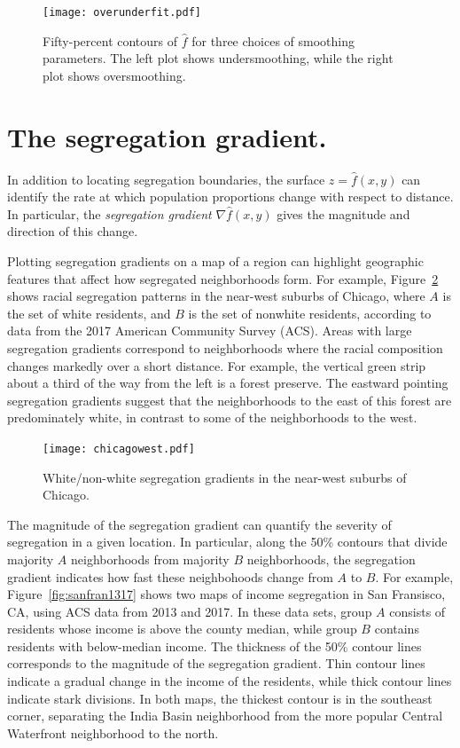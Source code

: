 \documentclass{article}
\theoremstyle{theorem}
\theoremstyle{definition}
\begin{document}
\begin{figure}
  \texttt{[image: overunderfit.pdf]}
  \caption{Fifty-percent contours of $\hat{f}$ for three choices of smoothing parameters. The left plot shows undersmoothing, while the right plot shows oversmoothing.}
  \label{fig:overunderfit}
\end{figure}

\section{The segregation gradient.}

In addition to locating segregation boundaries, the surface $z = \hat{f}(x,y)$ can identify the rate at which population proportions change with respect to distance. In particular, the \textit{segregation gradient} $\nabla \hat{f}(x,y)$ gives the magnitude and direction of this change.

Plotting segregation gradients on a map of a region can highlight geographic features that affect how segregated neighborhoods form. For example, Figure~\ref{fig:chicagowest} shows racial segregation patterns in the near-west suburbs of Chicago, where $A$ is the set of white residents, and $B$ is the set of nonwhite residents, according to data from the 2017 American Community Survey (ACS). Areas with large segregation gradients correspond to neighborhoods where the racial composition changes markedly over a short distance. For example, the vertical green strip about a third of the way from the left is a forest preserve. The eastward pointing segregation gradients suggest that the neighborhoods to the east of this forest are predominately white, in contrast to some of the neighborhoods to the west.

\begin{figure}
  \texttt{[image: chicagowest.pdf]}
  \caption{White/non-white segregation gradients in the near-west suburbs of Chicago.}
  \label{fig:chicagowest}
\end{figure}

The magnitude of the segregation gradient can quantify the severity of segregation in a given location. In particular, along the 50\% contours that divide majority $A$ neighborhoods from majority $B$ neighborhoods, the segregation gradient indicates how fast these neighbohoods change from $A$ to $B$. For example, Figure~\ref{fig:sanfran1317} shows two maps of income segregation in San Fransisco, CA, using ACS data from 2013 and 2017. In these data sets, group $A$ consists of residents whose income is above the county median, while group $B$ contains residents with below-median income. The thickness of the 50\% contour lines corresponds to the magnitude of the segregation gradient. Thin contour lines indicate a gradual change in the income of the residents, while thick contour lines indicate stark divisions. In both maps, the thickest contour is in the southeast corner, separating the India Basin neighborhood from the more popular Central Waterfront neighborhood to the north.
\end{document}
